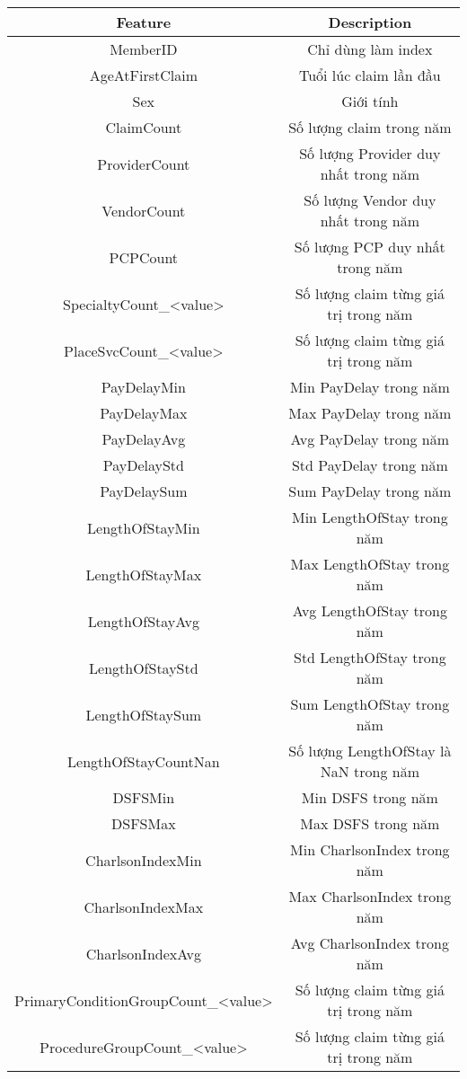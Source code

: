 \begin{longtable}[c]{| c | c |}
     \hline
     Feature & Description \\
     \hline
     MemberID & Chỉ dùng làm index \\
     AgeAtFirstClaim & Tuổi lúc claim lần đầu \\
     Sex & Giới tính \\
     ClaimCount & Số lượng claim trong năm \\
     ProviderCount & Số lượng Provider duy nhất trong năm \\
     VendorCount & Số lượng Vendor duy nhất trong năm \\
     PCPCount & Số lượng PCP duy nhất trong năm \\
     SpecialtyCount\_<value> & Số lượng claim từng giá trị trong năm \\
     PlaceSvcCount\_<value> & Số lượng claim từng giá trị trong năm \\
     PayDelayMin & Min PayDelay trong năm \\
     PayDelayMax & Max PayDelay trong năm \\
     PayDelayAvg & Avg PayDelay trong năm \\
     PayDelayStd & Std PayDelay trong năm \\
     PayDelaySum & Sum PayDelay trong năm \\
     LengthOfStayMin & Min LengthOfStay trong năm \\
     LengthOfStayMax & Max LengthOfStay trong năm \\
     LengthOfStayAvg & Avg LengthOfStay trong năm \\
     LengthOfStayStd & Std LengthOfStay trong năm \\
     LengthOfStaySum & Sum LengthOfStay trong năm \\
     LengthOfStayCountNan & Số lượng LengthOfStay là NaN trong năm \\ 
     DSFSMin & Min DSFS trong năm \\
     DSFSMax & Max DSFS trong năm \\
     CharlsonIndexMin & Min CharlsonIndex trong năm \\
     CharlsonIndexMax & Max CharlsonIndex trong năm \\
     CharlsonIndexAvg & Avg CharlsonIndex trong năm \\
     PrimaryConditionGroupCount\_<value> & Số lượng claim từng giá trị trong năm \\
     ProcedureGroupCount\_<value> & Số lượng claim từng giá trị trong năm \\

\end{longtable}
